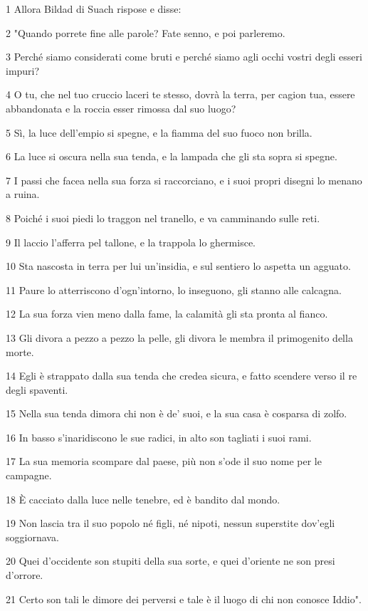 \par 1 Allora Bildad di Suach rispose e disse:
\par 2 "Quando porrete fine alle parole? Fate senno, e poi parleremo.
\par 3 Perché siamo considerati come bruti e perché siamo agli occhi vostri degli esseri impuri?
\par 4 O tu, che nel tuo cruccio laceri te stesso, dovrà la terra, per cagion tua, essere abbandonata e la roccia esser rimossa dal suo luogo?
\par 5 Sì, la luce dell'empio si spegne, e la fiamma del suo fuoco non brilla.
\par 6 La luce si oscura nella sua tenda, e la lampada che gli sta sopra si spegne.
\par 7 I passi che facea nella sua forza si raccorciano, e i suoi propri disegni lo menano a ruina.
\par 8 Poiché i suoi piedi lo traggon nel tranello, e va camminando sulle reti.
\par 9 Il laccio l'afferra pel tallone, e la trappola lo ghermisce.
\par 10 Sta nascosta in terra per lui un'insidia, e sul sentiero lo aspetta un agguato.
\par 11 Paure lo atterriscono d'ogn'intorno, lo inseguono, gli stanno alle calcagna.
\par 12 La sua forza vien meno dalla fame, la calamità gli sta pronta al fianco.
\par 13 Gli divora a pezzo a pezzo la pelle, gli divora le membra il primogenito della morte.
\par 14 Egli è strappato dalla sua tenda che credea sicura, e fatto scendere verso il re degli spaventi.
\par 15 Nella sua tenda dimora chi non è de' suoi, e la sua casa è cosparsa di zolfo.
\par 16 In basso s'inaridiscono le sue radici, in alto son tagliati i suoi rami.
\par 17 La sua memoria scompare dal paese, più non s'ode il suo nome per le campagne.
\par 18 È cacciato dalla luce nelle tenebre, ed è bandito dal mondo.
\par 19 Non lascia tra il suo popolo né figli, né nipoti, nessun superstite dov'egli soggiornava.
\par 20 Quei d'occidente son stupiti della sua sorte, e quei d'oriente ne son presi d'orrore.
\par 21 Certo son tali le dimore dei perversi e tale è il luogo di chi non conosce Iddio".

